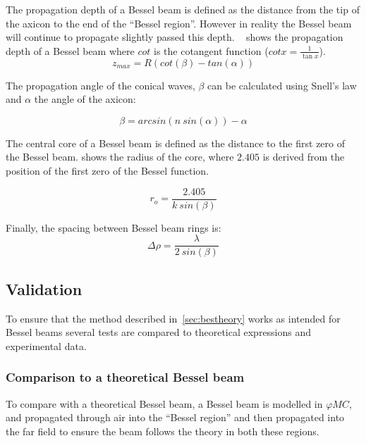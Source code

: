 The propagation depth of a Bessel beam is defined as the distance from the tip of the axicon to the end of the ``Bessel region''. However in reality the Bessel beam will continue to propagate slightly passed this depth.
~ shows the propagation depth of a Bessel beam where $cot$ is the cotangent function ($cot x = \tfrac{1}{\tan x}$).
\begin{equation}
z_{max}=R\left(cot\left(\beta\right) - tan\left(\alpha\right)\right)
\label{eqn:besselzmax}
\end{equation}

The propagation angle of the conical waves, $\beta$ can be calculated using Snell's law and $\alpha$ the angle of the axicon:

\begin{equation}
\beta = arcsin\left(n\ sin\left(\alpha\right)\right)-\alpha
\label{eqn:betaangle}
\end{equation}

The central core of a Bessel beam is defined as the distance to the first zero of the Bessel beam.
 shows the radius of the core, where $2.405$ is derived from the position of the first zero of the Bessel function.

\begin{equation}
r_o = \frac{2.405}{k\ sin\left(\beta\right)}
\label{eqn:coreradius}
\end{equation}

Finally, the spacing between Bessel beam rings is:
\begin{equation}
\Delta \rho = \frac{\lambda}{2\ sin\left(\beta\right)}
\end{equation}

\subsection{Validation}

To ensure that the method described in~\cref{sec:bestheory} works as intended for Bessel beams several tests are compared to theoretical expressions and experimental data.

\subsubsection*{Comparison to a theoretical Bessel beam}

To compare with a theoretical Bessel beam, a Bessel beam is modelled in $\varphi MC$, and propagated through air into the ``Bessel region'' and then propagated into the far field to ensure the beam follows the theory in both these regions.

